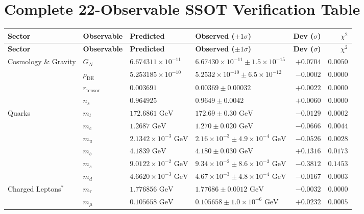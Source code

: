 \documentclass[11pt, a4paper]{article}
\begin{document}
\section{Complete 22-Observable SSOT Verification Table}

{\small
\setlength{\tabcolsep}{4pt}
\begin{longtable}{p{2.6cm} l l p{4.1cm} r r}
\toprule
\textbf{Sector} & \textbf{Observable} & \textbf{Predicted} & \textbf{Observed ($\pm 1\sigma$)} & \textbf{Dev ($\sigma$)} & \textbf{$\chi^2$} \\
\midrule
\endfirsthead
\toprule
\textbf{Sector} & \textbf{Observable} & \textbf{Predicted} & \textbf{Observed ($\pm 1\sigma$)} & \textbf{Dev ($\sigma$)} & \textbf{$\chi^2$} \\
\midrule
\endhead
\bottomrule
\endfoot
Cosmology \& Gravity & $G_N$ & $6.674311 \times 10^{-11}$ & $6.67430 \times 10^{-11} \pm 1.5 \times 10^{-15}$ & $+0.0704$ & $0.0050$ \\
 & $\rho_{\text{DE}}$ & $5.253185 \times 10^{-10}$ & $5.2532 \times 10^{-10} \pm 6.5 \times 10^{-12}$ & $-0.0002$ & $0.0000$ \\
 & $r_{\text{tensor}}$ & $0.003691$ & $0.00369 \pm 0.00032$ & $+0.0022$ & $0.0000$ \\
 & $n_s$ & $0.964925$ & $0.9649 \pm 0.0042$ & $+0.0060$ & $0.0000$ \\
\midrule
Quarks & $m_t$ & $172.6861\text{ GeV}$ & $172.69 \pm 0.30\text{ GeV}$ & $-0.0129$ & $0.0002$ \\
 & $m_c$ & $1.2687\text{ GeV}$ & $1.270 \pm 0.020\text{ GeV}$ & $-0.0666$ & $0.0044$ \\
 & $m_u$ & $2.1342 \times 10^{-3}\text{ GeV}$ & $2.16 \times 10^{-3} \pm 4.9 \times 10^{-4}\text{ GeV}$ & $-0.0526$ & $0.0028$ \\
 & $m_b$ & $4.1839\text{ GeV}$ & $4.180 \pm 0.030\text{ GeV}$ & $+0.1316$ & $0.0173$ \\
 & $m_s$ & $9.0122 \times 10^{-2}\text{ GeV}$ & $9.34 \times 10^{-2} \pm 8.6 \times 10^{-3}\text{ GeV}$ & $-0.3812$ & $0.1453$ \\
 & $m_d$ & $4.6620 \times 10^{-3}\text{ GeV}$ & $4.67 \times 10^{-3} \pm 4.8 \times 10^{-4}\text{ GeV}$ & $-0.0167$ & $0.0003$ \\
\midrule
Charged Leptons$^*$ & $m_\tau$ & $1.776856\text{ GeV}$ & $1.77686 \pm 0.0012\text{ GeV}$ & $-0.0032$ & $0.0000$ \\
 & $m_\mu$ & $0.105658\text{ GeV}$ & $0.105658 \pm 1.0 \times 10^{-6}\text{ GeV}$ & $+0.0232$ & $0.0005$ \\

\end{longtable}}
\end{document}
